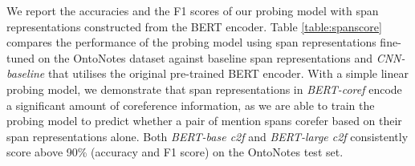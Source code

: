 \documentclass[11pt]{article}
\begin{document}







We report the accuracies and the F1 scores of our probing model with span representations constructed from the BERT encoder. Table \ref{table:spanscore} compares the performance of the probing model using span representations fine-tuned on the OntoNotes dataset against baseline span representations and \textit{CNN-baseline} that utilises the original pre-trained BERT encoder. With a simple linear probing model, we demonstrate that span representations in \textit{BERT-coref} encode a significant amount of coreference information, as we are able to train the probing model to predict whether a pair of mention spans corefer based on their span representations alone. Both \textit{BERT-base c2f} and \textit{BERT-large c2f} consistently score above 90\% (accuracy and F1 score) on the OntoNotes test set. 
\end{document}
